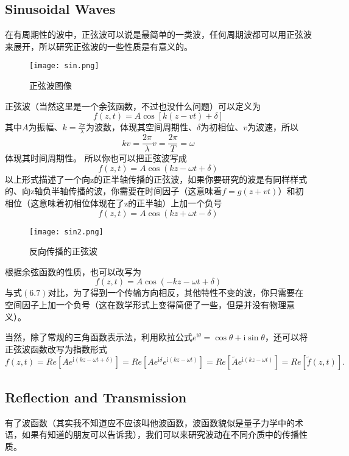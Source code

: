 \documentclass[14pt,oneside]{book}
\def \i{\mathrm{i}}
\begin{document}
\begin{large}
\subsection{Sinusoidal Waves}
在有周期性的波中，正弦波可以说是最简单的一类波，任何周期波都可以用正弦波来展开，所以研究正弦波的一些性质是有意义的。
\begin{figure}[H]
\centering
  \texttt{[image: sin.png]}
  \caption{正弦波图像}
\end{figure}
正弦波（当然这里是一个余弦函数，不过也没什么问题）可以定义为
\begin{equation}
f(z, t)=A \cos [k(z-v t)+\delta]
\end{equation}
其中$A$为振幅、$k=\frac{2\pi}{\lambda}$为波数，体现其空间周期性、$\delta$为初相位、$v$为波速，所以
\begin{equation}
  kv=\frac{2\pi}{\lambda}v=\frac{2\pi}{T}=\omega
\end{equation}
体现其时间周期性。
所以你也可以把正弦波写成
\begin{equation}
  f(z, t)=A \cos (kz-\omega t+\delta)
\end{equation}
以上形式描述了一个向z的正半轴传播的正弦波，如果你要研究的波是有同样样式的、向z轴负半轴传播的波，你需要在时间因子（这意味着$f=g(z+vt)$）和初相位（这意味着初相位体现在了z的正半轴）上加一个负号
\begin{equation}
    f(z, t)=A \cos (kz+\omega t-\delta)
\end{equation}
\begin{figure}[H]
\centering
  \texttt{[image: sin2.png]}
  \caption{反向传播的正弦波}
\end{figure}
\!\!\!\!\!\!\!\!\!根据余弦函数的性质，也可以改写为
\begin{equation}
     f(z, t)=A \cos (-kz-\omega t+\delta)
\end{equation}
与式$(6.7)$对比，为了得到一个传输方向相反，其他特性不变的波，你只需要在空间因子上加一个负号（这在数学形式上变得简便了一些，但是并没有物理意义）。

当然，除了常规的三角函数表示法，利用欧拉公式$e^{\mathrm{i}\theta}=\cos \theta+\i\sin\theta $，还可以将正弦波函数改写为指数形式
\begin{equation}
  f(z,t)=Re[Ae^{\i(kz-\omega t+\delta)}]=Re[Ae^{\i \delta}e^{\i(kz-\omega t)}]=Re[\tilde Ae^{\i(kz-\omega t)}]=Re[\tilde f(z,t)].
\end{equation}


\subsection{Reflection and Transmission}
有了波函数（其实我不知道应不应该叫他波函数，波函数貌似是量子力学中的术语，如果有知道的朋友可以告诉我），我们可以来研究波动在不同介质中的传播性质。


\end{large}
\end{document}
